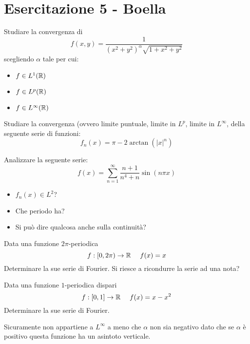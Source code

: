 \chapter{Esercitazione 5 - Boella}
\ParteEsercizi
\Esercizio{}

Studiare la convergenza di
\begin{equation*}
f( x,y) =\frac{1}{(x^{2} +y^{2} )^{\alpha }\sqrt{1+x^{2} +y^{2}}}
\end{equation*}
scegliendo $\alpha $ tale per cui:
\begin{itemize}
\item $f\in L^{1} (\mathbb{R}  )$
\item $f\in L^{p} (\mathbb{R}  )$
\item $f\in L^{\infty } (\mathbb{R}  )$
\end{itemize}
\Esercizio{}

Studiare la convergenza (ovvero limite puntuale, limite in $L^{p}$, limite in $L^{\infty }$, della seguente serie di funzioni:
\begin{equation*}
f_{n} (x)=\pi -2\arctan (|x|^{n} )
\end{equation*}
\Esercizio{}

Analizzare la seguente serie:
\begin{equation*}
f(x)=\sum ^{\infty }_{n=1}\frac{n+1}{n^{4} +n}\sin (n\pi x)
\end{equation*}
\begin{itemize}
\item $f_{n} (x)\in L^{2}$?
\item Che periodo ha?
\item Si può dire qualcosa anche sulla continuità?
\end{itemize}
\Esercizio{}

Data una funzione $2\pi $-periodica
\begin{equation*}
f:[ 0,2\pi )\rightarrow \RR  \ \ \ \ f(x)=x
\end{equation*}
Determinare la sue serie di Fourier. Si riesce a ricondurre la serie ad una nota?
\Esercizio{}

Data una funzione $1$-periodica dispari
\begin{equation*}
f:[ 0,1]\rightarrow \RR  \ \ \ \ f(x)=x-x^{2}
\end{equation*}
Determinare la sue serie di Fourier.
\ParteSoluzioni
\Soluzione

Sicuramente non appartiene a $L^{\infty }$ a meno che $\alpha $ non sia negativo dato che se $\alpha $ è positivo questa funzione ha un asintoto verticale.

